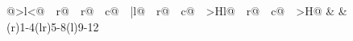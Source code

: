 \documentclass[11pt,letterpaper]{article}
\newcommand{\lex}[1]{\textit{#1}} %
\begin{document}
\begin{table}[t]\small\centering
\begin{tabular}{@{}>{\textsc\bgroup}l<{\egroup}@{~~}r@{~~}r@{~~}c@{~~}|l@{~~}r@{~~}c@{~~}>{\smaller}Hl@{~~}r@{~~}c@{~~}>{\smaller}H@{}}
 &  &  \\
\cmidrule(r){1-4}\cmidrule(lr){5-8}\cmidrule(l){9-12}




\end{tabular}
\end{table}
\end{document}

